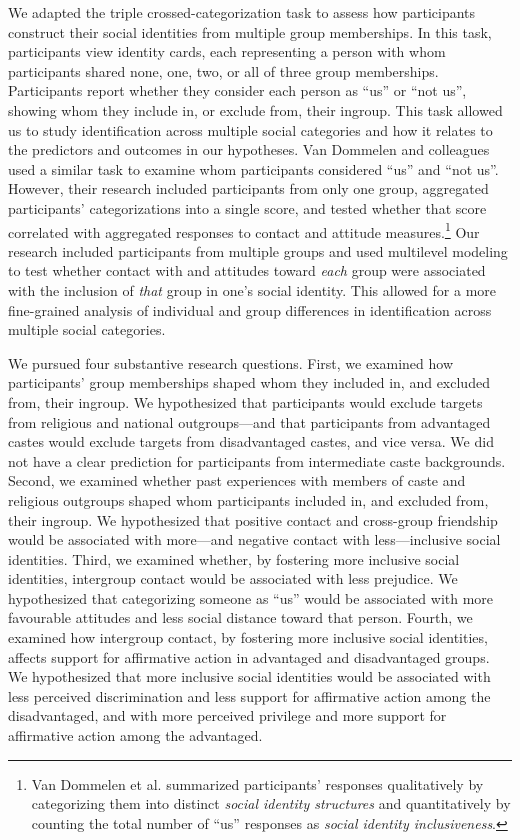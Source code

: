 \documentclass[12pt, a4paper]{article}
\begin{document}
We adapted the triple crossed-categorization task \cite{dommelen_construing_2015} to assess how participants construct their social identities from multiple group memberships. In this task, participants view identity cards, each representing a person with whom participants shared none, one, two, or all of three group memberships. Participants report whether they consider each person as ``us'' or ``not us'', showing whom they include in, or exclude from, their ingroup. This task allowed us to study identification across multiple social categories and how it relates to the predictors and outcomes in our hypotheses. Van Dommelen and colleagues \citeyear{dommelen_construing_2015} used a similar task to examine whom participants considered ``us'' and ``not us''. However, their research included participants from only one group, aggregated participants' categorizations into a single score, and tested whether that score correlated with aggregated responses to contact and attitude measures.\footnote{Van Dommelen et al. \citeyear{dommelen_construing_2015} summarized participants' responses qualitatively by categorizing them into distinct \emph{social identity structures} and quantitatively by counting the total number of ``us'' responses as \emph{social identity inclusiveness}.} Our research included participants from multiple groups and used multilevel modeling to test whether contact with and attitudes toward \emph{each} group were associated with the inclusion of \emph{that} group in one's social identity. This allowed for a more fine-grained analysis of individual and group differences in identification across multiple social categories.

We pursued four substantive research questions. First, we examined how participants' group memberships shaped whom they included in, and excluded from, their ingroup. We hypothesized that participants would exclude targets from religious and national outgroups---and that participants from advantaged castes would exclude targets from disadvantaged castes, and vice versa. We did not have a clear prediction for participants from intermediate caste backgrounds. Second, we examined whether past experiences with members of caste and religious outgroups shaped whom participants included in, and excluded from, their ingroup. We hypothesized that positive contact and cross-group friendship would be associated with more---and negative contact \cite{barlow_contact_2012, hayward_toward_2017} with less---inclusive social identities. Third, we examined whether, by fostering more inclusive social identities, intergroup contact would be associated with less prejudice. We hypothesized that categorizing someone as ``us'' would be associated with more favourable attitudes and less social distance toward that person. Fourth, we examined how intergroup contact, by fostering more inclusive social identities, affects support for affirmative action in advantaged and disadvantaged groups. We hypothesized that more inclusive social identities would be associated with less perceived discrimination and less support for affirmative action among the disadvantaged, and with more perceived privilege and more support for affirmative action among the advantaged.
\end{document}
